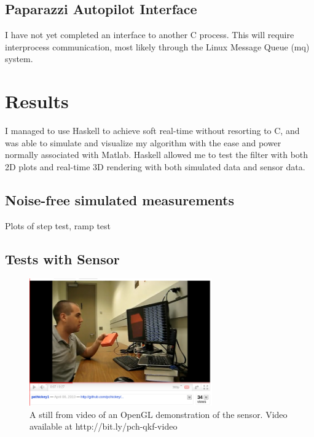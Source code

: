 \documentclass[12pt]{report}
\begin{document}
\subsection{Paparazzi Autopilot Interface}
I have not yet completed an interface to another C process. This will require interprocess communication, most likely through the Linux Message Queue (mq) system.

\section{Results}

I managed to use Haskell to achieve soft real-time without resorting to C, and was able to simulate and visualize my algorithm with the ease and power normally associated with Matlab. Haskell allowed me to test the filter with both 2D plots and real-time 3D rendering with both simulated data and sensor data.

\subsection{Noise-free simulated measurements}
Plots of step test, ramp test

\subsection{Tests with Sensor}
\begin{figure}
  \centering
    \includegraphics[width=0.7\textwidth]{./youtube-screenshot.png}
  \caption{A still from video of an OpenGL demonstration of the sensor. Video available at http://bit.ly/pch-qkf-video}
\end{figure}




\end{document}
